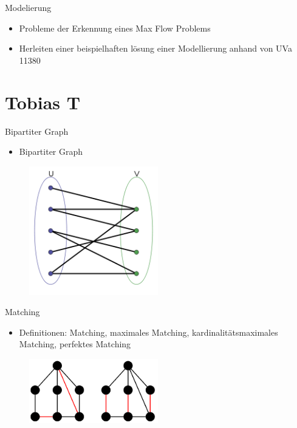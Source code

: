 \documentclass[18pt]{beamer}
\begin{document}
\begin{frame}{Modelierung}
	\begin{itemize}
		\item Probleme der Erkennung eines Max Flow Problems
		\item Herleiten einer beispielhaften l\"osung einer Modellierung anhand von UVa 11380
	\end{itemize}
\end{frame}


\section{Tobias T}
\begin{frame}{Bipartiter Graph}
	\begin{itemize}
		\item Bipartiter Graph
	\end{itemize}
	\begin{figure}
		\includegraphics[width = 0.5\textwidth] {img/TobiasT_Bipartit.jpg}
	\end{figure}
\end{frame}

\begin{frame}{Matching}
	\begin{itemize}
		\item Definitionen: Matching, maximales Matching, kardinalit\"atsmaximales Matching, perfektes Matching
	\end{itemize}
	\begin{figure}
		\includegraphics[width = 0.5\textwidth]{img/TobiasT_Matching.jpg}
	\end{figure}
\end{frame}
\end{document}
